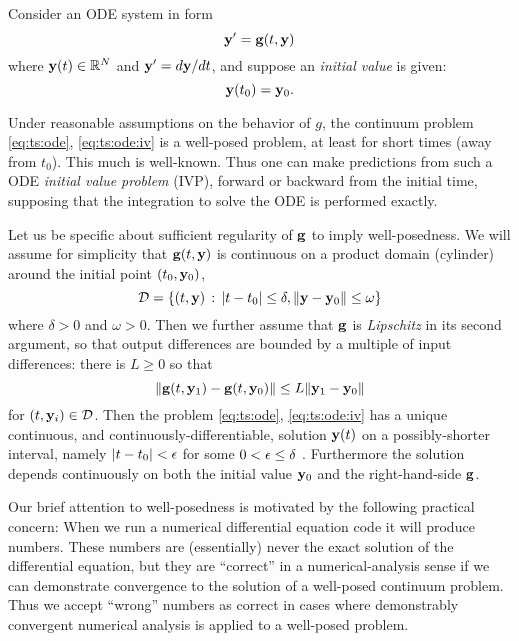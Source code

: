 Consider an ODE system in form
\begin{equation}
\mathbf{y}' = \mathbf{g}(t,\mathbf{y})  \label{eq:ts:ode}
\end{equation}
where $\mathbf{y}(t) \in \mathbb{R}^N$ and $\mathbf{y}'=d\mathbf{y}/dt$, and suppose an \emph{initial value} is given:
\begin{equation}
\mathbf{y}(t_0) = \mathbf{y}_0.  \label{eq:ts:ode:iv}
\end{equation}

Under reasonable assumptions on the behavior of $g$, the continuum problem \eqref{eq:ts:ode}, \eqref{eq:ts:ode:iv} is a well-posed problem, at least for short times (away from $t_0$).  This much is well-known.  Thus one can make predictions from such a ODE \emph{initial value problem} (IVP), forward or backward from the initial time, supposing that the integration to solve the ODE is performed exactly.

Let us be specific about sufficient regularity of $\mathbf{g}$ to imply well-posedness.  We will assume for simplicity that $\mathbf{g}(t,\mathbf{y})$ is continuous on a product domain (cylinder) around the initial point $(t_0,\mathbf{y}_0)$,
   $$\mathcal{D} = \{(t,\mathbf{y}) \,:\, |t-t_0| \le \delta, \|\mathbf{y} - \mathbf{y}_0\| \le \omega\}$$
where $\delta > 0$ and $\omega > 0$.  Then we further assume that $\mathbf{g}$ is \emph{Lipschitz} in its second argument, so that output differences are bounded by a multiple of input differences: there is $L\ge 0$ so that
\begin{equation}
\|\mathbf{g}(t,\mathbf{y}_1) - \mathbf{g}(t,\mathbf{y}_0)\| \le L \|\mathbf{y}_1-\mathbf{y}_0\|  \label{eq:ts:glipschitz}
\end{equation}
for $(t,\mathbf{y}_i) \in \mathcal{D}$.  Then the problem \eqref{eq:ts:ode}, \eqref{eq:ts:ode:iv} has a unique continuous, and continuously-differentiable, solution $\mathbf{y}(t)$ on a possibly-shorter interval, namely $|t-t_0|<\epsilon$ for some $0 < \epsilon \le \delta$ \citep[section 17.5]{HirschSmaleDevaney2004}.  Furthermore the solution depends continuously on both the initial value $\mathbf{y}_0$ and the right-hand-side $\mathbf{g}$.

Our brief attention to well-posedness is motivated by the following practical concern:  When we run a numerical differential equation code it will produce numbers.  These numbers are (essentially) never the exact solution of the differential equation, but they are ``correct'' in a numerical-analysis sense if we can demonstrate convergence to the solution of a well-posed continuum problem.  Thus we accept ``wrong'' numbers as correct in cases where demonstrably convergent numerical analysis is applied to a well-posed problem.

